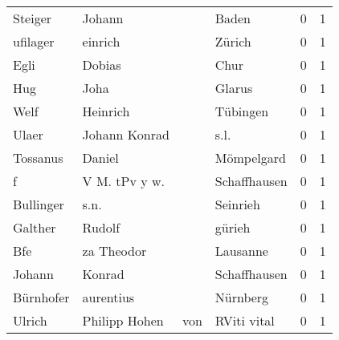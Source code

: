 \begin{tabular}{llllrr}
                  Steiger &                             Johann &             &                                       Baden &          0 &         1 \\
                 ufilager &                            einrich &             &                                      Zürich &          0 &         1 \\
                     Egli &                             Dobias &             &                                        Chur &          0 &         1 \\
                      Hug &                               Joha &             &                                      Glarus &          0 &         1 \\
                     Welf &                           Heinrich &             &                                    Tübingen &          0 &         1 \\
                    Ulaer &                      Johann Konrad &             &                                        s.l. &          0 &         1 \\
                 Tossanus &                             Daniel &             &                                  Mömpelgard &          0 &         1 \\
                        f &                      V M. tPv y w. &             &                                Schaffhausen &          0 &         1 \\
                Bullinger &                               s.n. &             &                                    Seinrieh &          0 &         1 \\
                  Galther &                             Rudolf &             &                                      gürieh &          0 &         1 \\
                      Bfe &                         za Theodor &             &                                    Lausanne &          0 &         1 \\
                   Johann &                             Konrad &             &                                Schaffhausen &          0 &         1 \\
                Bürnhofer &                          aurentius &             &                                    Nürnberg &          0 &         1 \\
                   Ulrich &                     Philipp  Hohen &         von &                                 RViti vital &          0 &         1 \\

\end{tabular}
